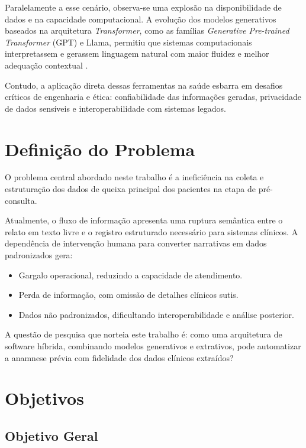 Paralelamente a esse cenário, observa-se uma explosão na disponibilidade de dados e na
capacidade computacional. A evolução dos modelos generativos baseados na arquitetura
\textit{Transformer},
como as famílias \textit{Generative Pre-trained Transformer} (GPT) e Llama, permitiu que sistemas computacionais interpretassem e
gerassem linguagem natural com maior fluidez e melhor adequação contextual
\cite{metaai2024,vaswani2017}.

Contudo, a aplicação direta dessas ferramentas na saúde esbarra em desafios críticos de
engenharia e ética: confiabilidade das informações geradas, privacidade de dados sensíveis e
interoperabilidade com sistemas legados.

\section{Definição do Problema}

O problema central abordado neste trabalho é a ineficiência na coleta e estruturação dos dados
de queixa principal dos pacientes na etapa de pré-consulta.

Atualmente, o fluxo de informação apresenta uma ruptura semântica entre o relato em texto
livre e o registro estruturado necessário para sistemas clínicos. A dependência de intervenção
humana para converter narrativas em dados padronizados gera:

\begin{itemize}
\item Gargalo operacional, reduzindo a capacidade de atendimento.
\item Perda de informação, com omissão de detalhes clínicos sutis.
\item Dados não padronizados, dificultando interoperabilidade e análise posterior.
\end{itemize}

A questão de pesquisa que norteia este trabalho é: como uma arquitetura de software híbrida,
combinando modelos generativos e extrativos, pode automatizar a anamnese prévia com
fidelidade dos dados clínicos extraídos?

\section{Objetivos}

\subsection{Objetivo Geral}

